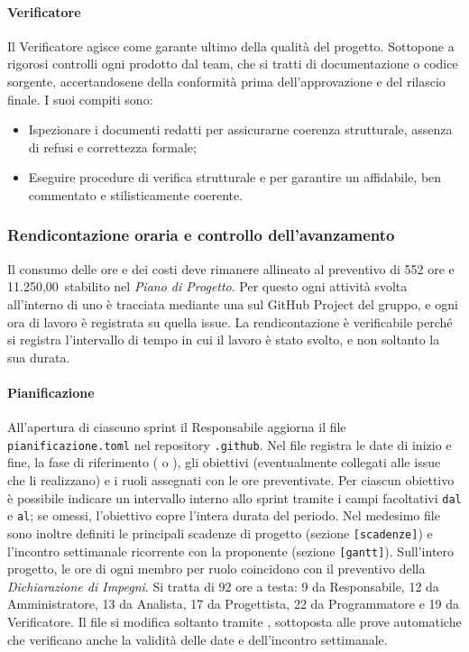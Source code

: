 \documentclass[documento]{gpt}
\begin{document}
	\paragraph{Verificatore}
	Il Verificatore agisce come garante ultimo della qualità del progetto. Sottopone a rigorosi controlli ogni  prodotto dal team, che si tratti di documentazione o codice sorgente, accertandosene della conformità prima dell'approvazione e del rilascio finale.
	I suoi compiti sono:
	\begin{itemize}
		\item Ispezionare i documenti redatti per assicurarne coerenza strutturale, assenza di refusi e correttezza formale;
		\item Eseguire procedure di verifica strutturale e  per garantire un  affidabile, ben commentato e stilisticamente coerente.
	\end{itemize}
	
	\subsubsection{Rendicontazione oraria e controllo dell'avanzamento}\label{sec:rendicontazione}
	Il consumo delle ore e dei costi deve rimanere allineato al preventivo di 552 ore e 11.250,00\,\texteuro{} stabilito nel \textit{Piano di Progetto}. Per questo ogni attività svolta all'interno di uno  è tracciata mediante una  sul GitHub Project del gruppo, e ogni ora di lavoro è registrata su quella issue. La rendicontazione è verificabile perché si registra l'intervallo di tempo in cui il lavoro è stato svolto, e non soltanto la sua durata.
	
	\paragraph{Pianificazione}
	All'apertura di ciascuno sprint il Responsabile aggiorna il file \texttt{pianificazione.toml} nel repository \texttt{.github}. Nel file registra le date di inizio e fine, la fase di riferimento ( o ), gli obiettivi (eventualmente collegati alle issue che li realizzano) e i ruoli assegnati con le ore preventivate. Per ciascun obiettivo è possibile indicare un intervallo interno allo sprint tramite i campi facoltativi \texttt{dal} e \texttt{al}; se omessi, l'obiettivo copre l'intera durata del periodo. Nel medesimo file sono inoltre definiti le principali scadenze di progetto (sezione \texttt{[scadenze]}) e l'incontro settimanale ricorrente con la proponente (sezione \texttt{[gantt]}). Sull'intero progetto, le ore di ogni membro per ruolo coincidono con il preventivo della \textit{Dichiarazione di Impegni}. Si tratta di 92 ore a testa: 9 da Responsabile, 12 da Amministratore, 13 da Analista, 17 da Progettista, 22 da Programmatore e 19 da Verificatore. Il file si modifica soltanto tramite , sottoposta alle prove automatiche che verificano anche la validità delle date e dell'incontro settimanale.
	
\end{document}

